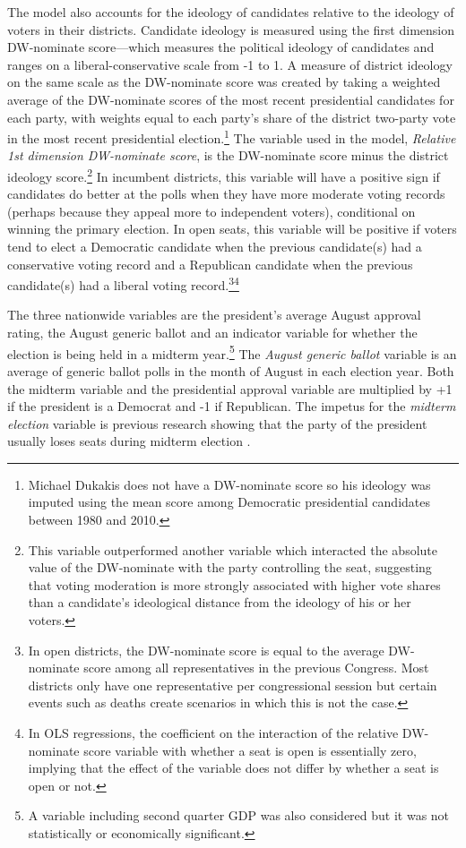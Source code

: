 \documentclass[12pt,final,fleqn]{article}
\theoremstyle{plain}
\begin{document}
The model also accounts for the ideology of candidates relative to the ideology of voters in their districts. Candidate ideology is measured using the first dimension DW-nominate score---which measures the political ideology of candidates and ranges on a liberal-conservative scale from -1 to 1. A measure of district ideology on the same scale as the DW-nominate score was created by taking a weighted average of the DW-nominate scores of the most recent presidential candidates for each party, with weights equal to each party's share of the district two-party vote in the most recent presidential election.\footnote{Michael Dukakis does not have a DW-nominate score so his ideology was imputed using the mean score among Democratic presidential candidates between 1980 and 2010.} The variable used in the model, \emph{Relative 1st dimension DW-nominate score}, is the DW-nominate score minus the district ideology score.\footnote{This variable outperformed another variable which interacted the absolute value of the DW-nominate with the party controlling the seat, suggesting that voting moderation is more strongly associated with higher vote shares than a candidate's ideological distance from the ideology of his or her voters.} In incumbent districts, this variable will have a positive sign if candidates do better at the polls when they have more moderate voting records (perhaps because they appeal more to independent voters), conditional on winning the primary election. In open seats, this variable will be positive if voters tend to elect a Democratic candidate when the previous candidate(s) had a conservative voting record and a Republican candidate when the previous candidate(s) had a liberal voting record.\footnote{In open districts, the DW-nominate score is equal to the average DW-nominate score among all representatives in the previous Congress. Most districts only have one representative per congressional session but certain events such as deaths create scenarios in which this is not the case.}\footnote{In OLS regressions, the coefficient on the interaction of the relative DW-nominate score variable with whether a seat is open is essentially zero, implying that the effect of the variable does not differ by whether a seat is open or not.}

The three nationwide variables are the president's average August approval rating, the August generic ballot and an indicator variable for whether the election is being held in a midterm year.\footnote{A variable including second quarter GDP was also considered but it was not statistically or economically significant.} The \emph{August generic ballot} variable is an average of generic ballot polls in the month of August in each election year. Both the midterm variable and the presidential approval variable are multiplied by +1 if the president is a Democrat and -1 if Republican. The impetus for the \emph{midterm election} variable is previous research showing that the party of the president usually loses seats during midterm election \citep[e.g.][]{erikson1988puzzle}. 
\end{document}
